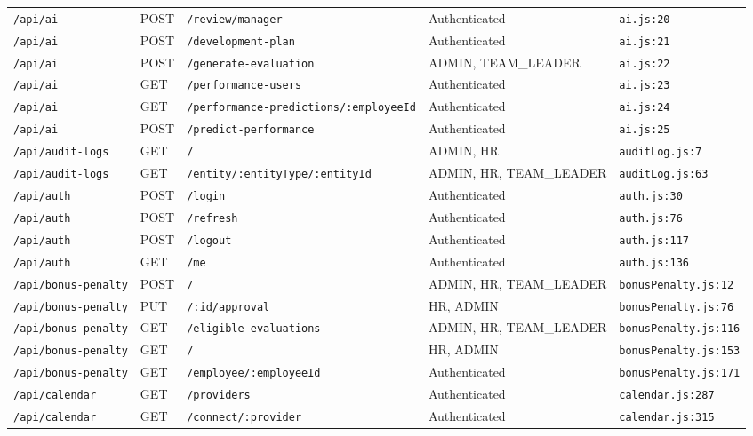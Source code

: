 \begin{landscape}
\begin{longtable}{p{}p{}p{}p{}p{}}
\texttt{/api/ai} & POST & \texttt{/review/manager} & Authenticated & \texttt{ai.js:20}\\
\texttt{/api/ai} & POST & \texttt{/development-plan} & Authenticated & \texttt{ai.js:21}\\
\texttt{/api/ai} & POST & \texttt{/generate-evaluation} & ADMIN,  TEAM\_LEADER & \texttt{ai.js:22}\\
\texttt{/api/ai} & GET & \texttt{/performance-users} & Authenticated & \texttt{ai.js:23}\\
\texttt{/api/ai} & GET & \texttt{/performance-predictions/:employeeId} & Authenticated & \texttt{ai.js:24}\\
\texttt{/api/ai} & POST & \texttt{/predict-performance} & Authenticated & \texttt{ai.js:25}\\
\texttt{/api/audit-logs} & GET & \texttt{/} & ADMIN,  HR & \texttt{auditLog.js:7}\\
\texttt{/api/audit-logs} & GET & \texttt{/entity/:entityType/:entityId} & ADMIN,  HR,  TEAM\_LEADER & \texttt{auditLog.js:63}\\
\texttt{/api/auth} & POST & \texttt{/login} & Authenticated & \texttt{auth.js:30}\\
\texttt{/api/auth} & POST & \texttt{/refresh} & Authenticated & \texttt{auth.js:76}\\
\texttt{/api/auth} & POST & \texttt{/logout} & Authenticated & \texttt{auth.js:117}\\
\texttt{/api/auth} & GET & \texttt{/me} & Authenticated & \texttt{auth.js:136}\\
\texttt{/api/bonus-penalty} & POST & \texttt{/} & ADMIN,  HR,  TEAM\_LEADER & \texttt{bonusPenalty.js:12}\\
\texttt{/api/bonus-penalty} & PUT & \texttt{/:id/approval} & HR,  ADMIN & \texttt{bonusPenalty.js:76}\\
\texttt{/api/bonus-penalty} & GET & \texttt{/eligible-evaluations} & ADMIN,  HR,  TEAM\_LEADER & \texttt{bonusPenalty.js:116}\\
\texttt{/api/bonus-penalty} & GET & \texttt{/} & HR,  ADMIN & \texttt{bonusPenalty.js:153}\\
\texttt{/api/bonus-penalty} & GET & \texttt{/employee/:employeeId} & Authenticated & \texttt{bonusPenalty.js:171}\\
\texttt{/api/calendar} & GET & \texttt{/providers} & Authenticated & \texttt{calendar.js:287}\\
\texttt{/api/calendar} & GET & \texttt{/connect/:provider} & Authenticated & \texttt{calendar.js:315}\\

\end{longtable}
\end{landscape}
